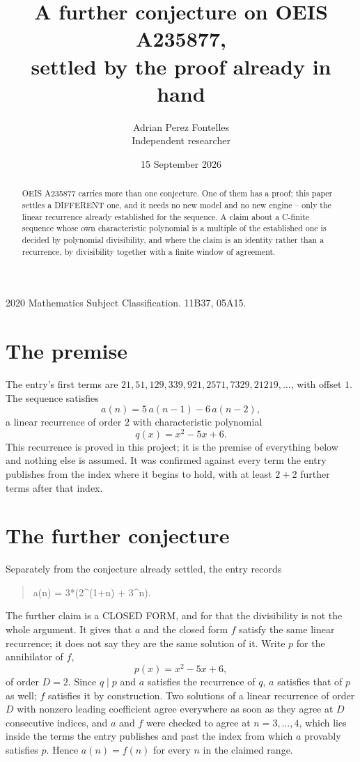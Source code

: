 \documentclass[11pt,a4paper]{article}
\title{A further conjecture on OEIS A235877,\\ \large settled by the proof already in hand}
\author{Adrian Perez Fontelles\\ \small Independent researcher}
\date{15 September 2026}
\theoremstyle{plain}
\theoremstyle{definition}
\begin{document}
\maketitle

\begin{abstract}
OEIS A235877 carries more than one conjecture. One of them has a proof; this paper settles a
DIFFERENT one, and it needs no new model and no new engine -- only the linear recurrence already
established for the sequence. A claim about a C-finite sequence whose own characteristic
polynomial is a multiple of the established one is decided by polynomial divisibility, and where
the claim is an identity rather than a recurrence, by divisibility together with a finite window
of agreement.
\end{abstract}

\noindent\small 2020 Mathematics Subject Classification. 11B37, 05A15.\normalsize

\section{The premise}

The entry's first terms are $21, 51, 129, 339, 921, 2571, 7329, 21219,\dots$, with offset $1$. The sequence satisfies
\[
  a(n)=5\,a(n-1) - 6\,a(n-2) ,
\]
a linear recurrence of order $2$ with characteristic polynomial
\[
  q(x)=x^{2} - 5 x + 6 .
\]
This recurrence is proved in this project; it is the premise of everything below and nothing else is assumed.
It was confirmed against every term the entry publishes from the index where it begins to hold,
with at least $2+2$ further terms after that index.

\section{The further conjecture}

Separately from the conjecture already settled, the entry records

\begin{quote}\raggedright a(n) = 3*(2\^{}(1+n) + 3\^{}n).\end{quote}

The further claim is a CLOSED FORM, and for that the divisibility is not the whole argument. It
gives that $a$ and the closed form $f$ satisfy the same linear recurrence; it does not say they
are the same solution of it. Write $p$ for the annihilator of $f$,
\[
  p(x)=x^{2} - 5 x + 6 ,
\]
of order $D=2$. Since $q\mid p$ and $a$ satisfies the recurrence of $q$, $a$ satisfies that of
$p$ as well; $f$ satisfies it by construction. Two solutions of a linear recurrence of order $D$
with nonzero leading coefficient agree everywhere as soon as they agree at $D$ consecutive
indices, and $a$ and $f$ were checked to agree at $n=3,\dots,4$,
which lies inside the terms the entry publishes and past the index from which $a$ provably
satisfies $p$. Hence $a(n)=f(n)$ for every $n$ in the claimed range.
\end{document}
